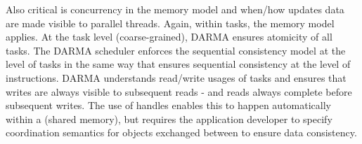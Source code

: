 
Also critical is concurrency in the \gls{memory model} and when/how updates data are made visible to parallel threads.  
Again, within tasks, the \CC{} \gls{memory model} applies.   
At the task level (coarse-grained), \gls{DARMA} ensures atomicity of all tasks. 
The \gls{DARMA} scheduler enforces the \CC{} sequential consistency model at
the level of tasks in the same way that \CC{} ensures sequential consistency at the level of instructions. 
\gls{DARMA} understands read/write usages of tasks and ensures that writes are always visible to subsequent reads - and reads always complete before subsequent writes.  
The use of \glspl{handle} enables this to happen automatically within a
  (shared memory), but requires the application developer to specify
  \gls{coordination semantics} for objects exchanged between  to ensure data consistency.





